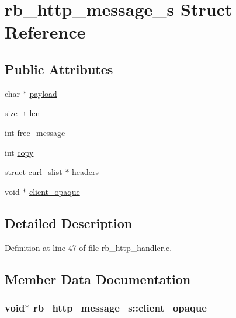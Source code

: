 \hypertarget{structrb__http__message__s}{\section{rb\-\_\-http\-\_\-message\-\_\-s Struct Reference}
\label{structrb__http__message__s}
}
\subsection*{Public Attributes}
\begin{DoxyCompactItemize}
\item 
char $\ast$ \hyperlink{structrb__http__message__s_a70cd28f794d09eb47cf19a37fb7ba42b}{payload}
\item 
size\-\_\-t \hyperlink{structrb__http__message__s_a8c352ee939f1cd197bf009583e61552f}{len}
\item 
int \hyperlink{structrb__http__message__s_acbfdd79b7ec041a7b7e0edac1da72d30}{free\-\_\-message}
\item 
int \hyperlink{structrb__http__message__s_aceda798a9af4f28a6dc89b273e6c348a}{copy}
\item 
struct curl\-\_\-slist $\ast$ \hyperlink{structrb__http__message__s_ae12176a1bd60ed536eda95e2c530acc4}{headers}
\item 
void $\ast$ \hyperlink{structrb__http__message__s_aa25eb69a09434b70882260a326dd704c}{client\-\_\-opaque}
\end{DoxyCompactItemize}


\subsection{Detailed Description}


Definition at line 47 of file rb\-\_\-http\-\_\-handler.\-c.



\subsection{Member Data Documentation}
\hypertarget{structrb__http__message__s_aa25eb69a09434b70882260a326dd704c}{
\subsubsection[{client\-\_\-opaque}]{\setlength{\rightskip}{0pt plus 5cm}void$\ast$ rb\-\_\-http\-\_\-message\-\_\-s\-::client\-\_\-opaque}}\label{structrb__http__message__s_aa25eb69a09434b70882260a326dd704c}


